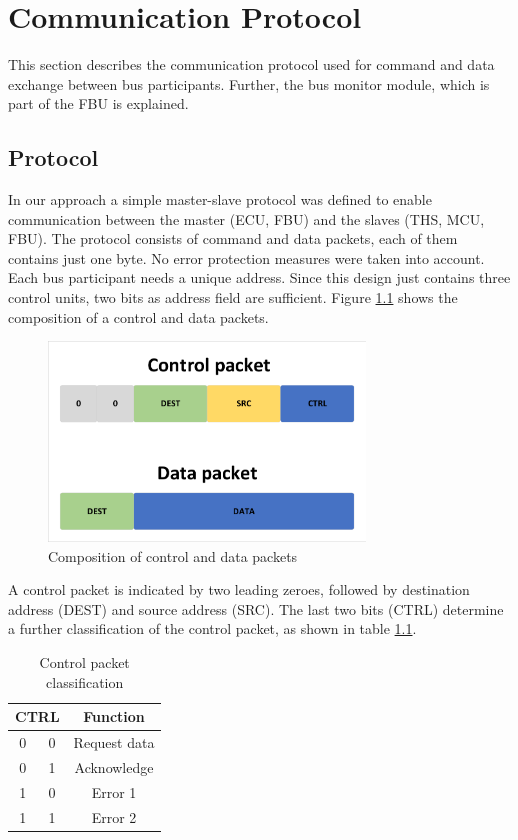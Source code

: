 \chapter{Communication Protocol}

This section describes the communication protocol used for command and data exchange between bus participants. Further, the bus monitor module, which is part of the \gls{FBU} is explained.

\section{Protocol}

In our approach a simple master-slave protocol was defined to enable communication between the master (\gls{ECU}, \gls{FBU}) and the slaves (\gls{THS}, \gls{MCU}, \gls{FBU}).
The protocol consists of command and data packets, each of them contains just one byte.
No error protection measures were taken into account.
Each bus participant needs a unique address. Since this design just contains three control units, two bits as address field are sufficient. Figure \ref{fig:Protocol} shows the composition of a control and data packets.

\begin{figure}[h!]
    \centering
    \includegraphics[width=0.75\textwidth]{figures/Protocol.pdf}
    \caption{Composition of control and data packets}\label{fig:Protocol}
\end{figure}

A control packet is indicated by two leading zeroes, followed by destination address (DEST) and source address (SRC). The last two bits (CTRL) determine a further classification of the control packet, as shown in table \ref{tab:controlPacket}.

\begin{table}[h!]
\begin{center}
\begin{tabular}{|c|c|c|}
\hline
\multicolumn{2}{|c|}{\textbf{CTRL}}&\textbf{Function} \\
\hline
0 & 0 & Request data \\
\hline
0 & 1 & Acknowledge \\
\hline
1 & 0 & Error 1 \\
\hline
1 & 1 & Error 2 \\
\hline
\end{tabular}
\label{tab:controlPacket}
\end{center}
\caption{Control packet classification}
\end{table}

